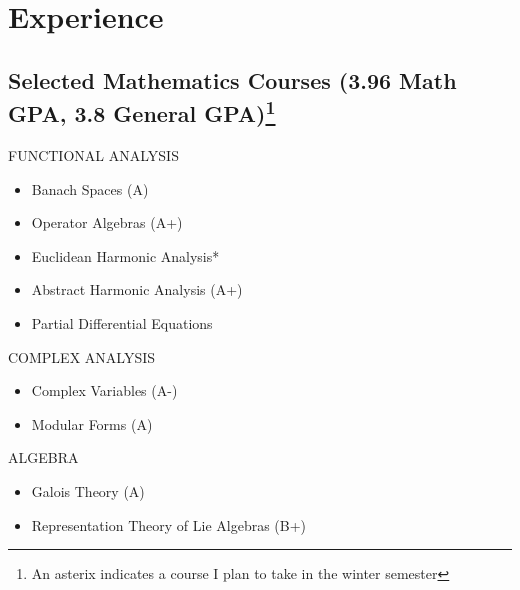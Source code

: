 \documentclass{friggeri-cv} %
\begin{document}
\section{Experience}

\subsection{Selected Mathematics Courses (3.96 Math GPA, 3.8 General GPA)\footnote{An asterix indicates a course I plan to take in the winter semester}}

\begin{entrylist}


\entries
{FUNCTIONAL ANALYSIS}
{
\begin{itemize}
    \setlength\itemsep{-1em}
    \item Banach Spaces (A)\\
    \item Operator Algebras (A+)\\
    \item Euclidean Harmonic Analysis*\\
    \item Abstract Harmonic Analysis (A+)\\
    \item Partial Differential Equations
\end{itemize}
}


\entries
{COMPLEX ANALYSIS}
{
\begin{itemize}
    \setlength\itemsep{-1em}
    \item Complex Variables (A-)\\
    \item Modular Forms (A)
\end{itemize}
}


\entries
{ALGEBRA}
{
\begin{itemize}
    \setlength\itemsep{-1em}
    \item Galois Theory (A)\\
    \item Representation Theory of Lie Algebras (B+)
\end{itemize}
}



\end{entrylist}
\end{document}
